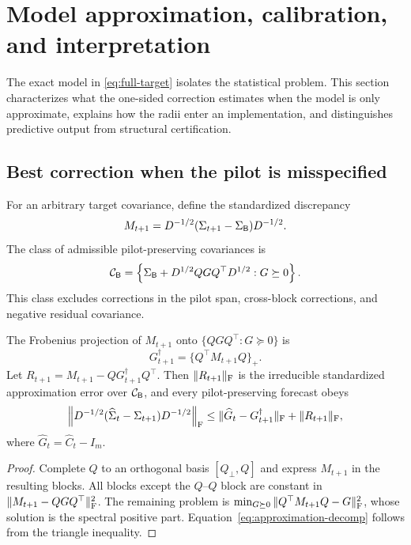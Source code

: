 \section{Model approximation, calibration, and interpretation}
\label{sec:calibration}

The exact model in \eqref{eq:full-target} isolates the statistical problem.  This section characterizes what the one-sided correction estimates when the model is only approximate, explains how the radii enter an implementation, and distinguishes predictive output from structural certification.

\subsection{Best correction when the pilot is misspecified}

For an arbitrary target covariance, define the standardized discrepancy
\begin{equation}
 M_{t+1}=D^{-1/2}(\Sigma_{t+1}-\Sigma_{\mathsf{B}})D^{-1/2}.
 \label{eq:standardized-discrepancy}
\end{equation}
The class of admissible pilot-preserving covariances is
\begin{equation}
 \mathcal C_{\mathsf{B}}=\left\{\Sigma_{\mathsf{B}}+D^{1/2}QGQ^\top D^{1/2}:G\succeq0\right\}.
 \label{eq:pilot-class}
\end{equation}
This class excludes corrections in the pilot span, cross-block corrections, and negative residual covariance.

\begin{proposition}
\label{prop:best-approximation}
The Frobenius projection of $M_{t+1}$ onto $\{QGQ^\top:G\succeq0\}$ is
\begin{equation}
 G_{t+1}^\dagger=\{Q^\top M_{t+1}Q\}_+.
 \label{eq:best-correction}
\end{equation}
Let
$R_{t+1}=M_{t+1}-QG_{t+1}^\dagger Q^\top$.  Then $\|R_{t+1}\|_{\mathrm{F}}$ is the irreducible standardized approximation error over $\mathcal C_{\mathsf{B}}$, and every pilot-preserving forecast obeys
\begin{equation}
 \left\|D^{-1/2}(\widehat\Sigma_t-\Sigma_{t+1})D^{-1/2}\right\|_{\mathrm{F}}
 \le \|\widehat G_t-G_{t+1}^\dagger\|_{\mathrm{F}}+\|R_{t+1}\|_{\mathrm{F}},
 \label{eq:approximation-decomp}
\end{equation}
where $\widehat G_t=\widehat C_t-I_m$.
\end{proposition}

\begin{proof}
Complete $Q$ to an orthogonal basis $[Q_\perp,Q]$ and express $M_{t+1}$ in the resulting blocks.  All blocks except the $Q$--$Q$ block are constant in
$\|M_{t+1}-QGQ^\top\|_{\mathrm{F}}^2$.  The remaining problem is
$\min_{G\succeq0}\|Q^\top M_{t+1}Q-G\|_{\mathrm{F}}^2$, whose solution is the spectral positive part.  Equation~\eqref{eq:approximation-decomp} follows from the triangle inequality.
\end{proof}

